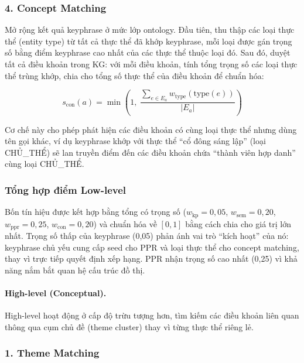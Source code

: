 \subsubsection*{4. Concept Matching}

Mở rộng kết quả keyphrase ở mức lớp ontology. Đầu tiên, thu thập các loại thực
thể (entity type) từ tất cả thực thể đã khớp keyphrase, mỗi loại được gán trọng
số bằng điểm keyphrase cao nhất của các thực thể thuộc loại đó. Sau đó, duyệt tất
cả điều khoản trong KG: với mỗi điều khoản, tính tổng trọng số các loại thực thể
trùng khớp, chia cho tổng số thực thể của điều khoản để chuẩn hóa:

\begin{equation}
  s_\text{con}(a) = \min\!\left(1,\;
    \frac{\displaystyle\sum_{e \in E_a} w_\text{type}\!\left(\text{type}(e)\right)}
         {|E_a|}
  \right)
  \label{eq:concept-score}
\end{equation}

Cơ chế này cho phép phát hiện các điều khoản có cùng loại thực thể nhưng dùng tên
gọi khác, ví dụ keyphrase khớp với thực thể ``cổ đông sáng lập'' (loại CHỦ\_THỂ)
sẽ lan truyền điểm đến các điều khoản chứa ``thành viên hợp danh'' cùng loại
CHỦ\_THỂ.

\subsubsection*{Tổng hợp điểm Low-level}

Bốn tín hiệu được kết hợp bằng tổng có trọng số ($w_\text{kp} = 0{,}05$,
$w_\text{sem} = 0{,}20$, $w_\text{ppr} = 0{,}25$, $w_\text{con} = 0{,}20$) và
chuẩn hóa về $[0, 1]$ bằng cách chia cho giá trị lớn nhất. Trọng số thấp của
keyphrase (0,05) phản ánh vai trò ``kích hoạt'' của nó: keyphrase chủ yếu cung
cấp seed cho PPR và loại thực thể cho concept matching, thay vì trực tiếp quyết
định xếp hạng. PPR nhận trọng số cao nhất (0,25) vì khả năng nắm bắt quan hệ cấu
trúc đồ thị.

\paragraph{High-level (Conceptual).}
\label{subsubsec:high-level}

High-level hoạt động ở cấp độ trừu tượng hơn, tìm kiếm các điều khoản liên quan
thông qua cụm chủ đề (theme cluster) thay vì từng thực thể riêng lẻ.

\subsubsection*{1. Theme Matching}

